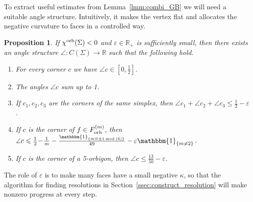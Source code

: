 \documentclass{amsart}
\newtheorem{proposition}[conjecture]{Proposition}
\newcommand{\cho}{\chi^{\textnormal{orb}}}
\newcommand{\Forb}[1][m]{F^{(#1)}_{\textnormal{orb}}}
\begin{document}
To extract useful estimates from Lemma~\ref{lmm:combi_GB} we will need a suitable angle structure. Intuitively, it makes the vertex flat and allocates the negative curvature to faces in a controlled way.
\begin{proposition}\label{prop:nice_angles}
If $\cho(\Sigma)<0$ and $\varepsilon\in\mathbb{R}_+$ is sufficiently small, then there exists an angle structure $\angle\colon C(\Sigma)\to\mathbb{R}$ such that the following hold.
\begin{enumerate}
\item For every corner $c$ we have $\angle c\in[0,\tfrac{1}{2}]$.
\item\label{itm:niceang_v} The angles $\angle c$ sum up to 1.
\item\label{itm:niceang_spx} If $c_1,c_2,c_3$ are the corners of the same simplex, then $\angle c_1\!+\!\angle c_2\!+\!\angle c_3\leqslant\tfrac{1}{2}\!-\!\varepsilon$.
\item\label{itm:niceang_orb} If $c$ is the corner of $f\in\Forb$, then $\angle c\leqslant\tfrac{1}{2}\!-\!\frac{1}{m}-\tfrac{\mathbbm{1}_{\{m\equiv\pm1\bmod(6)\}}}{49}-\varepsilon\mathbbm{1}_{\{m\neq2\}}$.
\item\label{itm:niceang_5} If $c$ is the corner of a 5-orbigon, then $\angle c\leqslant\tfrac{13}{50}-\varepsilon$.
\end{enumerate}
\end{proposition}
The role of $\varepsilon$ is to make many faces have a small negative $\kappa$, so that the algorithm for finding resolutions in Section~\ref{ssec:construct_resolution} will make nonzero progress at every step.
\end{document}
